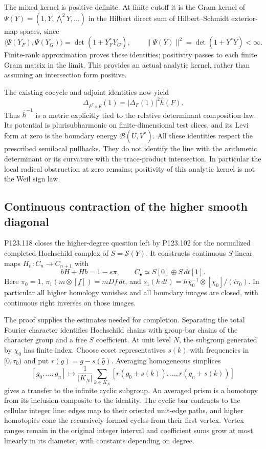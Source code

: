 The mixed kernel is positive definite. At finite cutoff it is the
Gram kernel of
$\Psi(Y)=(1,Y,\bigwedge^2Y,\ldots)$ in the Hilbert direct sum of
Hilbert--Schmidt exterior-map spaces, since
\[
 \langle\Psi(Y_F),\Psi(Y_G)\rangle=\det(1+Y_F^*Y_G),
 \qquad \|\Psi(Y)\|^2=\det(1+Y^*Y)<\infty.
\]
Finite-rank approximation proves these identities; positivity passes
to each finite Gram matrix in the limit. This provides an actual
analytic kernel, rather than assuming an intersection form positive.

The existing cocycle and adjoint identities now yield
\[
 \Delta_{F^*\mathbin{\diamond}F}(1)
          =|\Delta_F(1)|^2\widehat h(F).
\]
Thus $\widehat h^{-1}$ is a metric explicitly tied to the relative
determinant composition law. Its potential is plurisubharmonic on
finite-dimensional test slices, and its Levi form at zero is the
boundary energy $\mathcal B(U,V^*)$. All these identities respect
the prescribed semilocal pullbacks. They do not identify the line with
the arithmetic determinant or its curvature with the trace-product
intersection. In particular the local radical obstruction at zero
remains; positivity of this analytic kernel is not the Weil sign law.

\subsection{Continuous contraction of the higher smooth diagonal}
P123.118 closes the higher-degree question left by P123.102 for the
normalized completed Hochschild complex of $S=\mathcal S(Y)$. It
constructs continuous $S$-linear maps $H_n:C_n\to C_{n+1}$ with
\[
 bH+Hb=1-s\pi,\qquad
 C_\bullet\simeq S[0]\oplus S\,dt[1].
\]
Here $\pi_0=1$, $\pi_1(m\otimes[f])=mDf\,dt$, and
$s_1(h\,dt)=h\chi_0^{-1}\otimes[\chi_0]/(i\tau_0)$.
In particular all higher homology vanishes and all boundary images
are closed, with continuous right inverses on those images.

The proof supplies the estimates needed for completion. Separating the
total Fourier character identifies Hochschild chains with group-bar
chains of the character group and a free $S$ coefficient. At unit
level $N$, the subgroup generated by $\chi_0$ has finite index. Choose
coset representatives $s(k)$ with frequencies in $[0,\tau_0)$ and put
$r(g)=g-s(\bar g)$. Averaging homogeneous simplices
\[
 [g_0,\ldots,g_n]\longmapsto
 \frac1{|K_N|}\sum_{k\in K_N}
 [r(g_0+s(k)),\ldots,r(g_n+s(k))]
\]
gives a transfer to the infinite cyclic subgroup. An averaged prism
is a homotopy from its inclusion-composite to the identity. The cyclic
bar contracts to the cellular integer line: edges map to their oriented
unit-edge paths, and higher homotopies cone the recursively formed
cycles from their first vertex. Vertex ranges remain in the original
integer interval and coefficient sums grow at most linearly in its
diameter, with constants depending on degree.

